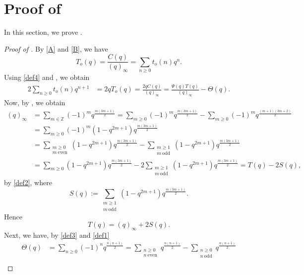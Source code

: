 \documentclass[10pt,a4paper]{amsart}
\renewcommand{\(}{\left\(}
\renewcommand{\)}{\right\)}
\numberwithin{equation}{section}
\numberwithin{equation}{section}
\begin{document}
\section{Proof of }\label{sec2}

In this section, we prove .


\begin{proof}[Proof of ]
By \eqref{A} and \eqref{B}, we have
\begin{equation}\label{def4}
T_o(q)=\frac{C(q)}{(q)_{\infty}}=\sum_{n\ge 0}t_o(n)q^n.
\end{equation}
Using \eqref{def4} and , we obtain
\begin{align}\label{eqn1}
2\sum_{n\ge 0}t_o(n)q^{n+1}&=2qT_o(q)=\frac{2qC(q)}{(q)_{\infty}}%
=\frac{\Psi(q)T(q)}{(q)_{\infty}}-\Theta(q).
\end{align}
Now, by , we obtain
\begin{align*}
(q)_{\infty}&=\sum_{m\in \mathbb{Z}}(-1)^m q^{\frac{m(3m+1)}{2}}%
=\sum_{m\ge 0}(-1)^m q^{\frac{m(3m+1)}{2}}-\sum_{m\ge 0}(-1)^m q^{\frac{(m+1)(3m+2)}{2}}\\
&=\sum_{m\ge 0}(-1)^m\left(1-q^{2m+1}\right) q^{\frac{m(3m+1)}{2}}\\
&=\sum_{\substack{m\ge 0\\m\ \text{even}}}\left(1-q^{2m+1}\right) q^{\frac{m(3m+1)}{2}}-\sum_{\substack{m\ge 1\\m\ \text{odd}}}\left(1-q^{2m+1}\right) q^{\frac{m(3m+1)}{2}}\\
&=\sum_{m\ge 0}\left(1-q^{2m+1}\right) q^{\frac{m(3m+1)}{2}}-2\sum_{\substack{m\ge 1\\m\ \text{odd}}}\left(1-q^{2m+1}\right) q^{\frac{m(3m+1)}{2}}=T(q)-2S(q),
\end{align*}
by \eqref{def2}, where
\[
S(q):=\sum_{\substack{m\ge 1\\m\ \text{odd}}} \left(1-q^{2m+1}\right)q^{\frac{m(3m+1)}{2}}.
\]
Hence
\begin{equation}\label{eqn2}
T(q)=(q)_{\infty}+2S(q).
\end{equation}
Next, we have, by \eqref{def3} and \eqref{def1}
\begin{align}\label{eqn3}
\Theta(q)&=\sum_{n\ge 0}(-1)^n q^{\frac{n(n+1)}{2}}=\sum_{\substack{n\ge 0\\n\ \text{even}}} q^{\frac{n(n+1)}{2}}-\sum_{\substack{n\ge 0\\n\ \text{odd}}} q^{\frac{n(n+1)}{2}}\nonumber\\

\end{align}
\end{proof}
\end{document}
